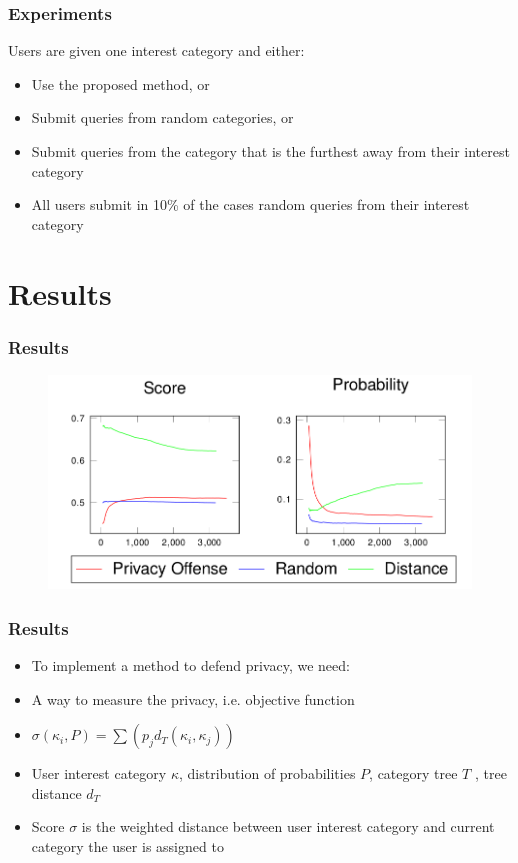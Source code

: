 \documentclass{beamer}
\begin{document}

\begin{frame}
	\frametitle{Experiments}
	Users are given one interest category
	and either:
	\begin{itemize}
		\item Use the proposed method, or
		\item Submit queries from random
		categories, or
		\item Submit queries from the category
		that is the furthest away from their
		interest category
		\item All users submit in 10\% of the cases
		random queries from their interest
		category
	\end{itemize}
	
\end{frame}

\section{Results}
\begin{frame}
	\frametitle{Results}
	\begin{figure}
		\includegraphics[width=0.8\linewidth]{Results_crop}
	\end{figure}
\end{frame}


\begin{frame}
	\frametitle{Results}
	\begin{itemize} %
		\item To implement a method to defend privacy, we need:
		\item A way to measure the privacy, i.e. objective function
		\item $\sigma(\kappa_{i},P)=\sum(p_{j}d_T(\kappa_{i},\kappa_{j}))$
		\item User interest category $\kappa$, distribution of probabilities $P$, category tree $T$ , tree distance $d_{T}$
		\item Score $\sigma$ is the weighted distance between user interest category and current
		category the user is assigned to
	\end{itemize}
\end{frame}
\end{document}
